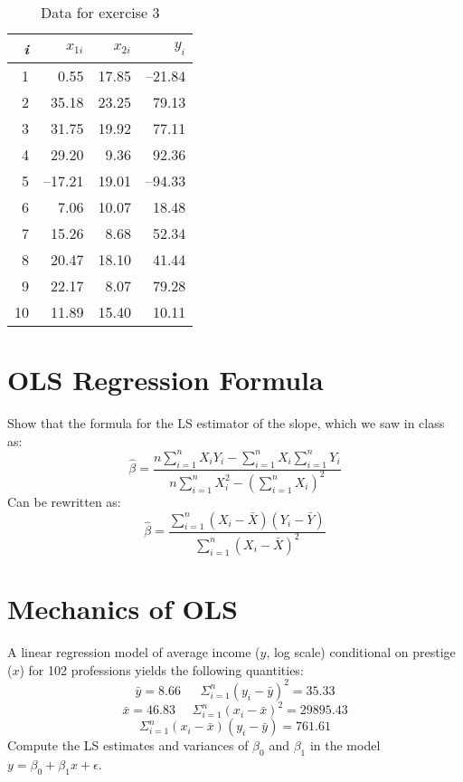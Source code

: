 \documentclass[12pt,letterpaper]{article}
\begin{document}
\begin{table}[h]
	\caption{Data for exercise 3}\label{table}
	\begin{center}
		\begin{tabular}{rrrr}
			\hline
			\emph{i} & $x_{1i}$ & $x_{2i}$ & $y_{i}$\\ \hline
			1   &    0.55& 17.85 &--21.84\\
			2   &   35.18& 23.25 & 79.13\\
			3   &   31.75& 19.92 & 77.11\\
			4   &   29.20&  9.36 & 92.36\\
			5   &  --17.21& 19.01 &--94.33\\
			6   &    7.06& 10.07 & 18.48\\
			7   &   15.26&  8.68 & 52.34\\
			8   &   20.47& 18.10 & 41.44\\
			9   &   22.17&  8.07 & 79.28\\
			10  &   11.89& 15.40 & 10.11\\ \hline
		\end{tabular}
	\end{center}
\end{table}

\newpage

\section{OLS Regression Formula}

Show that the formula for the LS estimator of the slope, which we saw in class as:
\[
\hat{\beta} = \frac{n\sum_{i=1}^{n}X_{i}Y_{i} - \sum_{i=1}^{n}X_{i}\sum_{i=1}^{n}Y_{i}}{n\sum_{i=1}^{n}X_{i}^{2} - \left(\sum_{i=1}^{n}X_{i}\right)^{2}}
\]
Can be rewritten as:
\begin{equation*}
\hat{\beta} = \frac{\sum_{i=1}^{n}(X_{i}-\bar{X})(Y_{i}-\bar{Y})}{\sum_{i=1}^{n}(X_{i}-\bar{X})^{2}}
\end{equation*}


\section{Mechanics of OLS}

A linear regression model of average income ($y$, log scale) conditional on prestige ($x$) for 102 professions yields the following quantities:
\[ \bar{y}=8.66~~~~~~~\Sigma_{i=1}^n (y_i - \bar{y})^2 = 35.33 \]
\[ \bar{x}=46.83~~~~~~\Sigma_{i=1}^n (x_i - \bar{x})^2 = 29895.43 \]
\[ \Sigma_{i=1}^n (x_i - \bar{x})(y_i - \bar{y}) = 761.61\] 
Compute the LS estimates and variances of $\beta_{0}$ and $\beta_{1}$ in the model $y = \beta_{0} + \beta_{1} x + \epsilon$. 
\end{document}

